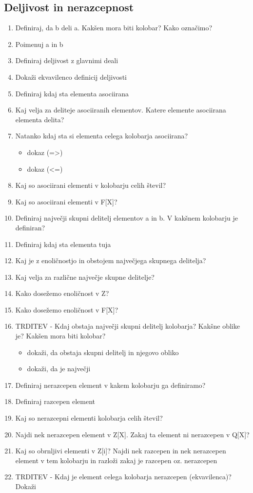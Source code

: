 \documentclass{article}
\begin{document}
    \subsection{Deljivost in nerazcepnost}
    \begin{enumerate}
        \item Definiraj, da b deli a. Kakšen mora biti kolobar? Kako označimo?
        \item Poimenuj a in b
        \item Definiraj deljivost z glavnimi deali
        \item Dokaži ekvavilenco definicij deljivosti 
        \item Definiraj kdaj sta elementa asociirana
        \item Kaj velja za deliteje asociiranih elementov. Katere elemente asociirana elementa delita?
        \item Natanko kdaj sta si elementa celega kolobarja asociirana?
        \begin{itemize}
            \item dokaz (=>)
            \item dokaz (<=)
        \end{itemize}
        \item Kaj so asociirani elementi v kolobarju celih števil?
        \item Kaj so asociirani elementi v F[X]?
        \item Definiraj največji skupni delitelj elementov a in b. V kakšnem kolobarju je definiran?
        \item Definiraj kdaj sta elementa tuja
        \item Kaj je z enoličnostjo in obstojem največjega skupnega delitelja?
        \item Kaj velja za različne največje skupne delitelje?
        \item Kako dosežemo enoličnost v Z?
        \item Kako dosežemo enoličnost v F[X]?
        \item TRDITEV - Kdaj obstaja največji skupni delitelj kolobarja? Kakšne oblike je? Kakšen mora biti kolobar?
        \begin{itemize}
            \item dokaži, da obstaja skupni delitelj in njegovo obliko
            \item dokaži, da je največji
        \end{itemize}
        \item Definiraj nerazcepen element v kakem kolobarju ga definiramo?
        \item Definiraj razcepen element
        \item Kaj so nerazcepni elementi kolobarja celih števil?
        \item Najdi nek nerazcepen element v Z[X]. Zakaj ta element ni nerazcepen v Q[X]?
        \item Kaj so obrnljivi elementi v Z[i]? Najdi nek razcepen in nek nerazcepen element v tem kolobarju in razloži zakaj je razcepen oz. nerazcepen
        \item TRDITEV - Kdaj je element celega kolobarja nerazcepen (ekvavilenca)? Dokaži
    \end{enumerate}
\end{document}
